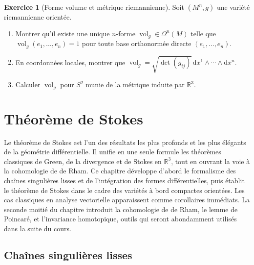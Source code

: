 \documentclass[12pt,a4paper,openany]{book}
\theoremstyle{definition}
\newtheorem{exercice}{Exercice}[chapter]
\theoremstyle{plain}
\theoremstyle{remark}
\newcommand{\R}{\mathbb{R}}
\newcommand{\dd}{\mathrm{d}}
\begin{document}
\begin{exercice}[Forme volume et métrique riemannienne]%
\label{exo:forme-volume}
Soit $(M^n, g)$ une variété riemannienne orientée.
\begin{enumerate}[label=\textup{(\alph*)}]
  \item Montrer qu'il existe une unique $n$-forme
    $\operatorname{vol}_g \in \Omega^n(M)$ telle que
    $\operatorname{vol}_g(e_1, \ldots, e_n) = 1$ pour toute base
    orthonormée directe $(e_1, \ldots, e_n)$.
  \item En coordonnées locales, montrer que
    $\operatorname{vol}_g = \sqrt{\det(g_{ij})}\, \dd x^1 \wedge
    \cdots \wedge \dd x^n$.
  \item Calculer $\operatorname{vol}_g$ pour $S^2$ munie de la métrique
    induite par $\R^3$.
\end{enumerate}
\end{exercice}



\chapter{Théorème de Stokes}\label{ch:stokes}
\minitoc\bigskip

Le théorème de Stokes est l'un des résultats les plus profonds et les plus
élégants de la géométrie différentielle. Il unifie en une seule formule
les théorèmes classiques de Green, de la divergence et de Stokes en
$\R^3$, tout en ouvrant la voie à la cohomologie de de Rham. Ce chapitre
développe d'abord le formalisme des chaînes singulières lisses et de
l'intégration des formes différentielles, puis établit le théorème de Stokes
dans le cadre des variétés à bord compactes orientées. Les cas classiques en
analyse vectorielle apparaissent comme corollaires immédiats. La seconde moitié
du chapitre introduit la cohomologie de de Rham, le lemme de Poincaré, et
l'invariance homotopique, outils qui seront abondamment utilisés dans la suite
du cours.

\section{Chaînes singulières lisses}\label{sec:chaines}
\end{document}
